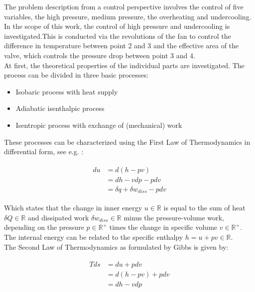 The problem description from a control perspective involves the control of five variables, the high pressure, medium pressure, the overheating and undercooling. In the scope of this work, the control of high pressure and undercooling is investigated.This is conducted via the revolutions of the fan to control the difference in temperature between point 2 and 3 and the effective area of the valve, which controls the pressure drop between point 3 and 4.\\

At first, the theoretical properties of the individual parts are investigated. The process can be divided in three basic processes:
\begin{itemize}
\item Isobaric process with heat supply
\item Adiabatic isenthalpic process 
\item Isentropic process with exchange of (mechanical) work
\end{itemize}
These processes can be characterized using the First Law of Thermodynamics in differential form, see e.g. \cite[p.25]{Weigand2013}:

\begin{align}
\begin{split}
du &= d \left( h - pv \right ) \\ &= dh - v dp - p dv \\
&= \delta q + \delta w_{diss} - p dv
\end{split}
\label{c:thermo:e:firstlaw}
\end{align}

Which states that the change in inner energy $u \in \mathbb{R}$ is equal to the sum of heat $\delta Q \in \mathbb{R}$ and dissipated work $\delta w_{diss} \in \mathbb{R}$ minus the pressure-volume work, depending on the pressure $p \in \mathbb{R}^+$ times the change in specific volume $v \in \mathbb{R}^+$. The internal energy can be related to the specific enthalpy $h = u +pv \in \mathbb{R}$.\\

The Second Law of Thermodynamics as formulated by Gibbs \cite[p.59]{Struchtrup2014} is given by:

\begin{align}
\begin{split}
T ds &= du + p dv \\
 &= d( h - pv ) + p dv \\
 &= dh - vdp
\end{split}
\label{c:thermo:e:secondlaw}
\end{align}

